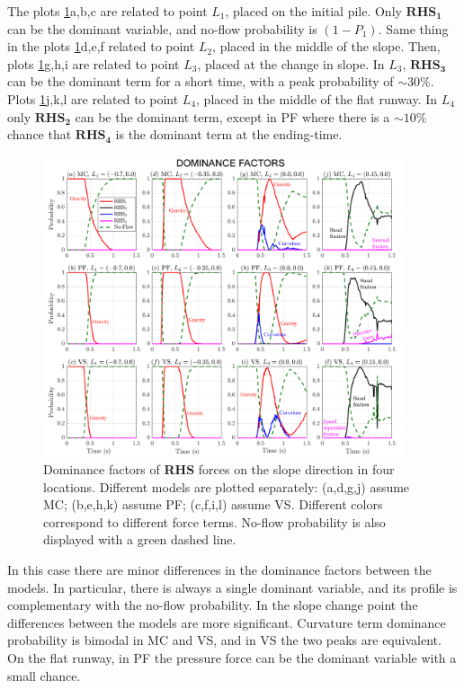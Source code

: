 \documentclass{article}
\begin{document}
The plots \ref{fig:Ramp-Pr_x}a,b,c are related to point $L_1$, placed on the initial pile. Only $\boldsymbol{RHS_1}$ can be the dominant variable, and no-flow probability is $(1-P_1)$. Same thing in the plots \ref{fig:Ramp-Pr_x}d,e,f related to point $L_2$, placed in the middle of the slope. Then, plots \ref{fig:Ramp-Pr_x}g,h,i are related to point $L_3$, placed at the change in slope. In $L_3$, $\boldsymbol{RHS_3}$ can be the dominant term for a short time, with a peak probability of $\sim 30\%$. Plots \ref{fig:Ramp-Pr_x}j,k,l are related to point $L_4$, placed in the middle of the flat runway. In $L_4$ only $\boldsymbol{RHS_2}$ can be the dominant term, except in PF where there is a $\sim 10\%$ chance that $\boldsymbol{RHS_4}$ is the dominant term at the ending-time.
\begin{figure}[H]
         \centering
        \includegraphics[width=0.95\textwidth]{figures/incline/Pr_x.png}
        \caption{Dominance factors of \textbf{RHS} forces on the slope direction in four locations. Different models are plotted separately: (a,d,g,j) assume MC; (b,e,h,k) assume PF; (c,f,i,l) assume VS. Different colors correspond to different force terms. No-flow probability is also displayed with a green dashed line.}
        \label{fig:Ramp-Pr_x}
\end{figure}
In this case there are minor differences in the dominance factors between the models. In particular, there is always a single dominant variable, and its profile is complementary with the no-flow probability. In the slope change point the differences between the models are more significant. Curvature term dominance probability is bimodal in MC and VS, and in VS the two peaks are equivalent. On the flat runway, in PF the pressure force can be the dominant variable with a small chance.
\end{document}
